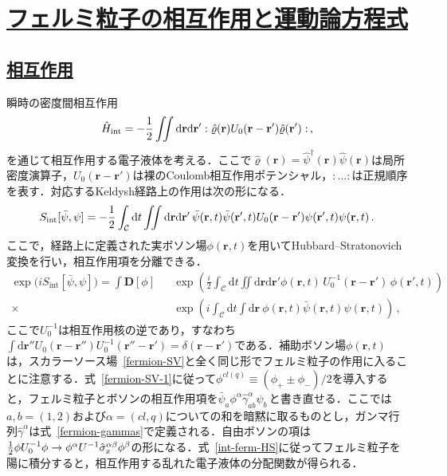 \documentclass[a4paper,11pt]{ltjsarticle}
\newcommand{\sectionlink}[1]{\section[#1]{\hyperlink{toc}{#1}}}
\newcommand{\subsectionlink}[1]{\subsection[#1]{\hyperlink{toc}{#1}}}
\def\d{\mathrm{d}}
\def\D{\mathbf{D}}
\def\rt{(\mathbf{r},t)}
\begin{document}

\sectionlink{フェルミ粒子の相互作用と運動論方程式}\label{sec_int_ferm}
\subsectionlink{相互作用}\label{sec_int_ferm-1}

瞬時の密度間相互作用
$$\hat{H}_{\mathrm{int}}=-{1\over 2} \iint\d\mathbf{r}\d\mathbf{r}'
:\hat\varrho(\mathbf{r}) U_{0}(\mathbf{r}-\mathbf{r}')
\hat{\varrho}(\mathbf{r}'):\,,$$
を通じて相互作用する電子液体を考える．ここで$\hat{\varrho}(\mathbf{r})
=\hat{\psi}^\dagger(\mathbf{r})\hat{\psi}(\mathbf{r})$は局所密度演算子，$U_{0}(\mathbf{r}-\mathbf{r}')$は裸のCoulomb相互作用ポテンシャル，$:\ldots:$は正規順序を表す．対応するKeldysh経路上の作用は次の形になる．
\begin{equation}\label{int-ferm-S-int}
S_{\mathrm{int}}[\bar{\psi},\psi]=-{1\over 2}\int_{\cal C} \d t
\iint\d\mathbf{r}\d\mathbf{r}'\,\bar{\psi}(\mathbf{r},t)
\bar{\psi}(\mathbf{r}',t)U_{0}(\mathbf{r}-\mathbf{r}')
\psi(\mathbf{r}',t)\psi(\mathbf{r},t)\,.
\end{equation}
ここで，経路上に定義された実ボソン場$\phi(\mathbf{r},t)$を用いてHubbard--Stratonovich変換を行い，相互作用項を分離できる．
\begin{eqnarray}\label{int-ferm-HS}
\exp\big(iS_{\mathrm{int}}[\bar{\psi},\psi]\big)=\int\D[\phi]\!\!\!\!\!\!\!\!&&\!\!
\exp\left(\frac{i}{2}\int_{\mathcal{C}}\d t
\iint\d\mathbf{r}\d\mathbf{r}'\phi\rt\,
U^{-1}_{0}(\mathbf{r}-\mathbf{r}')\,\phi(\mathbf{r}',t)\right)\nonumber \\
\times \!\!&&\!\!\!\!\!\!\! \exp\left(i\int_{\mathcal{C}}\d
t\int\d\mathbf{r}\ \phi\rt \bar{\psi}\rt\psi\rt \right)\, ,
\end{eqnarray}
ここで$U^{-1}_{0}$は相互作用核の逆であり，すなわち$\int\d\mathbf{r}'' U_{0}(\mathbf{r}-\mathbf{r}'')
U^{-1}_{0}(\mathbf{r}''-\mathbf{r}')=\delta(\mathbf{r}-\mathbf{r}')$である．補助ボソン場$\phi\rt$は，スカラーソース場~\eqref{fermion-SV}と全く同じ形でフェルミ粒子の作用に入ることに注意する．式~\eqref{fermion-SV-1}に従って$\phi^{cl(q)}\equiv(\phi_{+}\pm\phi_{-})/2$を導入すると，フェルミ粒子とボソンの相互作用項を$\bar\psi_{a}\phi^{\alpha}\hat \gamma^\alpha_{ab}\psi_b\,$と書き直せる．ここでは$a,b=(1,2)$および$\alpha=(cl,q)$についての和を暗黙に取るものとし，ガンマ行列$\hat{\gamma}^{\alpha}$は式~\eqref{fermion-gammas}で定義される．自由ボソンの項は${1\over 2} \phi U^{-1}_{0}\phi\to \phi^\alpha U^{-1}\hat
\sigma^{\alpha\beta}_{x}\phi^\beta$の形になる．式~\eqref{int-ferm-HS}に従ってフェルミ粒子を陽に積分すると，相互作用する乱れた電子液体の分配関数が得られる．
\end{document}
